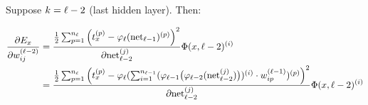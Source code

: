
Suppose $k = {\ell} - 2$ (last hidden layer). Then:

\begin{align}
    \frac{\partial E_x}{\partial w_{ij}^{({\ell}-2)}} &= \frac{\frac{1}{2} \sum_{p=1}^{n_{\ell}} \left ( t_x^{(p)} -\varphi_{{\ell}}(\mathrm{net}_{{\ell}-1})^{(p)} \right )^2}{\partial \mathrm{net}_{{\ell}-2}^{(j)}} \Phi(x, {\ell}-2)^{(i)}\\
    &= \frac{\frac{1}{2} \sum_{p=1}^{n_{\ell}} \left ( t_x^{(p)} -\varphi_{{\ell}}(\sum_{i=1}^{n_{{\ell}-1}} (
        \varphi_{{\ell}-1} \big (\varphi_{{\ell}-2}(\mathrm{net}_{{\ell}-2}^{(j)}) \big)
    )^{(i)} \cdot w_{ip}^{({\ell}-1)})^{(p)} \right )^2}{\partial \mathrm{net}_{{\ell}-2}^{(j)}} \Phi(x, {\ell}-2)^{(i)}\\
\end{align}